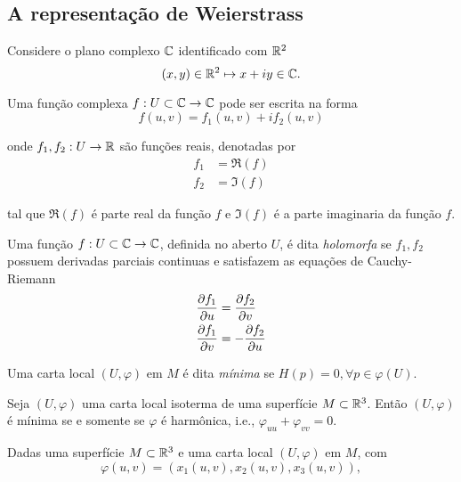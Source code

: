 \subsection{A representação de Weierstrass}

Considere o plano complexo $\mathbb{C}$ identificado com $\mathbb{R}^2$
\begin{equation*}
(x,y) \in \mathbb{R}^2 \mapsto x + iy \in \mathbb{C}.
\end{equation*}

Uma função complexa $f: U \subset \mathbb{C} \rightarrow \mathbb{C}$ pode ser escrita na forma
\begin{equation*}
f(u,v) = f_1(u,v) + i f_2(u,v)
\end{equation*}

onde $f_1, f_2: U \rightarrow \mathbb{R}$ são funções reais, denotadas por
\begin{align*}
f_1 &= \Re(f)\\
f_2 &= \Im(f)
\end{align*}

tal que $\Re(f)$ é parte real da função $f$ e $\Im(f)$ é a parte imaginaria da função $f$.

\begin{definicao}
	Uma função $f: U \subset \mathbb{C} \rightarrow \mathbb{C}$, definida no aberto $U$, é dita \emph{holomorfa} se $f_1, f_2$ possuem derivadas parciais continuas e satisfazem as equações de Cauchy-Riemann
	\begin{align*}
	\frac{\partial f_1}{\partial u} &= \frac{\partial f_2}{\partial v}\\
	\frac{\partial f_1}{\partial v} &= - \frac{\partial f_2}{\partial u}
	\end{align*}
\end{definicao}

\begin{definicao}
	Uma carta local $(U, \varphi)$ em $M$ é dita \emph{mínima} se $H(p) = 0, \forall p \in \varphi(U)$.
\end{definicao}

\begin{corolario}\label{equiv_isoterma_harmonica}
	Seja $(U, \varphi)$ uma carta local isoterma de uma superfície $M \subset \mathbb{R}^3$. Então $(U, \varphi)$ é mínima se e somente se $\varphi$ é harmônica, i.e., $\varphi_{uu} + \varphi_{vv} = 0$.
\end{corolario}

Dadas uma superfície $M \subset \mathbb{R}^3$ e uma carta local $(U, \varphi)$ em $M$, com
\begin{equation*}
\varphi(u,v) = (x_1(u,v), x_2(u,v), x_3(u,v)),
\end{equation*}

